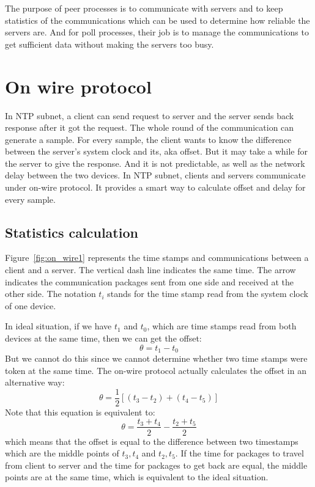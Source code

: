 

The purpose of peer processes is to communicate with servers and to keep
statistics of the communications which can be used to determine how reliable
the servers are. And for poll processes, their job is to manage the
communications to get sufficient data without making the servers too busy.

\section{On wire protocol}%
\label{sec:on_wire_protocol}
In NTP subnet, a client can send request to server and the server sends back
response after it got the request. The whole round of the communication can
generate a sample. For every sample, the client wants to know the difference
between the server's system clock and its, aka offset.
But it may take a while for the server to give the response. And it is not
predictable, as well as the network delay between the two devices.
In NTP subnet, clients and servers communicate under on-wire protocol. It
provides a smart way to calculate offset and delay for every sample. 

\subsection{Statistics calculation}%
\label{sub:statistics_calculation}
Figure~\ref{fig:on_wire1} represents the time stamps and communications between
a client and a server. The vertical dash line indicates the same time. The
arrow indicates the communication packages sent from one side and received at
the other side. The notation $t_i$ stands for the time stamp read from the
system clock of one device. 



In ideal situation, if we have $t_1$ and $t_0$, which are time stamps read from
both devices at the same time, then we can get the offset:
$$\theta = t_1 - t_0$$
But we cannot do this since we cannot determine whether two time stamps were
token at the same time. The on-wire protocol actually calculates the offset in
an alternative way:
$$\theta = \frac{1}{2}\left[(t_3 - t_2) + (t_4 - t_5)\right]$$
Note that this equation is equivalent to:
$$\theta = \frac{t_3 + t_4}{2} - \frac{t_2 + t_5}{2}$$
which means that the offset is equal to the difference between two timestamps
which are the middle points of $t_3, t_4$ and $t_2, t_5$. If the time for
packages to travel from client to server and the time for packages to get back
are equal, the middle points are at the same time, which is equivalent to the
ideal situation.

